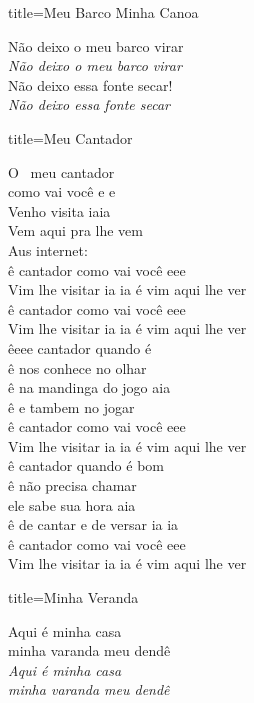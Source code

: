 \documentclass[fontsize=14pt, twoside]{scrreprt}
\begin{document}
\begin{multicols*}{2}
\begin{song}{title={Meu Barco Minha Canoa}}
\begin{verse*}
            Não deixo o meu barco virar\\
            \textit{Não deixo o meu barco virar}\\
            Não deixo essa fonte secar!\\
            \textit{Não deixo essa fonte secar}\\
        \end{verse*}
\end{song}
\columnbreak
\begin{song}{title={Meu Cantador}}
        \begin{verse*}
            O \ meu cantador\\
            como vai você e e\\
            Venho visita iaia\\
            Vem aqui pra lhe vem\\
            Aus internet:\\
            ê cantador como vai você eee\\
            Vim lhe visitar ia ia é vim aqui lhe ver\\
            ê cantador como vai você eee\\
            Vim lhe visitar ia ia é vim aqui lhe ver\\
            êeee cantador quando é\\
            ê nos conhece no olhar\\
            ê na mandinga do jogo aia\\
            ê e tambem no jogar\\
            ê cantador como vai você eee\\
            Vim lhe visitar ia ia é vim aqui lhe ver\\
            ê cantador quando é bom\\
            ê não precisa chamar\\
            ele sabe sua hora aia\\
            ê de cantar e de versar ia ia\\
            ê cantador como vai você eee\\
            Vim lhe visitar ia ia é vim aqui lhe ver\\
        \end{verse*}
\end{song}

\columnbreak
\begin{song}{title={Minha Veranda}}
        \begin{verse*}
            Aqui é minha casa\\
            minha varanda meu dendê\\
            \textit{Aqui é minha casa}\\
            \textit{minha varanda meu dendê}\\


\end{verse*}
\end{song}
\end{multicols*}
\end{document}
